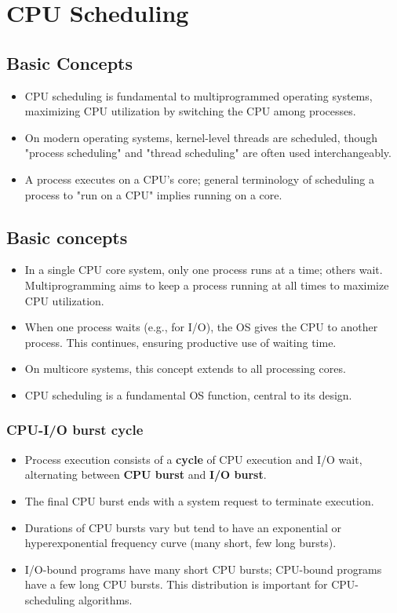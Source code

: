 \section{CPU Scheduling}\label{sec:5.1}

\subsection{Basic Concepts}
\begin{itemize}
    \item CPU scheduling is fundamental to multiprogrammed operating systems, maximizing CPU utilization by switching the CPU among processes.
    \item On modern operating systems, kernel-level threads are scheduled, though "process scheduling" and "thread scheduling" are often used interchangeably.
    \item A process executes on a CPU's core; general terminology of scheduling a process to "run on a CPU" implies running on a core.
\end{itemize}

\subsection{Basic concepts}
\begin{itemize}
    \item In a single CPU core system, only one process runs at a time; others wait. Multiprogramming aims to keep a process running at all times to maximize CPU utilization.
    \item When one process waits (e.g., for I/O), the OS gives the CPU to another process. This continues, ensuring productive use of waiting time.
    \item On multicore systems, this concept extends to all processing cores.
    \item CPU scheduling is a fundamental OS function, central to its design.
\end{itemize}

\subsubsection{CPU-I/O burst cycle}
\begin{itemize}
    \item Process execution consists of a \textbf{cycle} of CPU execution and I/O wait, alternating between \textbf{CPU burst} and \textbf{I/O burst}.
    \item The final CPU burst ends with a system request to terminate execution.
    \item Durations of CPU bursts vary but tend to have an exponential or hyperexponential frequency curve (many short, few long bursts).
    \item I/O-bound programs have many short CPU bursts; CPU-bound programs have a few long CPU bursts. This distribution is important for CPU-scheduling algorithms.
\end{itemize}


